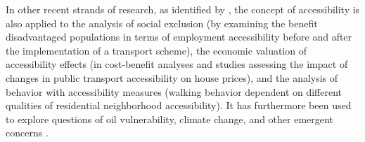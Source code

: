 In other recent strands of research, as identified by \citet{GeursEtAl2012AccessibilityTransportIntroduction},
the concept of accessibility is also applied to the analysis of social exclusion (\eg by examining the benefit 
disadvantaged populations in terms of employment accessibility before and after the implementation of a 
transport scheme), the economic valuation of accessibility effects (\eg in cost-benefit analyses and studies 
assessing the impact of changes in public transport accessibility on house prices), and the analysis of behavior 
with accessibility measures (\eg walking behavior dependent on different qualities of residential neighborhood 
accessibility). It has furthermore been used to explore questions of oil vulnerability, climate change, and 
other emergent concerns \citep{CurtisEtAl2013AccessbilityPolicyInnovation}.



